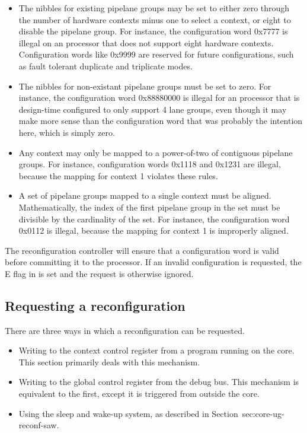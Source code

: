 \begin{itemize}

\item The nibbles for existing pipelane groups may be set to either zero through 
the number of hardware contexts minus one to select a context, or eight to 
disable the pipelane group. For instance, the configuration word 0x7777 is
illegal on an \rvex{} processor that does not support eight hardware contexts.
Configuration words like 0x9999 are reserved for future configurations, such as
fault tolerant duplicate and triplicate modes.

\item The nibbles for non-existant pipelane groups must be set to zero. For 
instance, the configuration word 0x88880000 is illegal for an \rvex{} processor 
that is design-time configured to only support 4 lane groups, even though it 
may make more sense than the configuration word that was probably the intention 
here, which is simply zero.

\item Any context may only be mapped to a power-of-two of contiguous pipelane
groups. For instance, configuration words 0x1118 and 0x1231 are illegal, because
the mapping for context 1 violates these rules.

\item A set of pipelane groups mapped to a single context must be aligned.
Mathematically, the index of the first pipelane group in the set must be
divisible by the cardinality of the set. For instance, the configuration word
0x0112 is illegal, because the mapping for context 1 is improperly aligned.

\end{itemize}

\noindent The reconfiguration controller will ensure that a configuration word 
is valid before committing it to the processor. If an invalid configuration is 
requested, the E flag in  is set and the request is otherwise ignored.

\subsection{Requesting a reconfiguration}
\label{sec:core-ug-reconf-request}

There are three ways in which a reconfiguration can be requested.

\begin{itemize}

\item Writing to the  context control register from a program running
on the core. This section primarily deals with this mechanism.

\item Writing to the  global control register from the debug bus. This
mechanism is equivalent to the first, except it is triggered from outside the
core.

\item Using the sleep and wake-up system, as described in
Section~{sec:core-ug-reconf-saw}.

\end{itemize}

